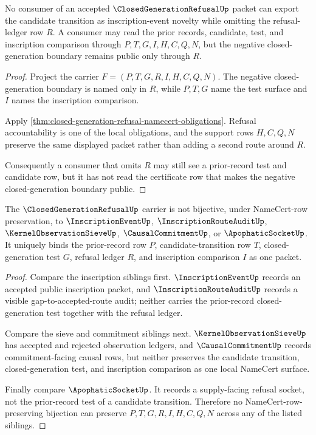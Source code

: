 \begin{theorem}
\label{thm:closed-generation-refusal-ledger-nonescape}
No consumer of an accepted $\ClosedGenerationRefusalUp$ packet can export the
candidate transition as inscription-event novelty while omitting the
refusal-ledger row $R$. A consumer may read the prior records, candidate,
test, and inscription comparison through $P,T,G,I,H,C,Q,N$, but the negative
closed-generation boundary remains public only through $R$.
\end{theorem}
\begin{proof}
Project the carrier $F=(P,T,G,R,I,H,C,Q,N)$. The negative
closed-generation boundary is named only in $R$, while $P,T,G$ name the test
surface and $I$ names the inscription comparison.

Apply \autoref{thm:closed-generation-refusal-namecert-obligations}. Refusal
accountability is one of the local obligations, and the support rows $H,C,Q,N$
preserve the same displayed packet rather than adding a second route around
$R$.

Consequently a consumer that omits $R$ may still see a prior-record test and
candidate row, but it has not read the certificate row that makes the negative
closed-generation boundary public.
\end{proof}

\begin{theorem}
\label{thm:closed-generation-refusal-sibling-independence}
The $\ClosedGenerationRefusalUp$ carrier is not bijective, under
NameCert-row preservation, to $\InscriptionEventUp$,
$\InscriptionRouteAuditUp$, $\KernelObservationSieveUp$,
$\CausalCommitmentUp$, or $\ApophaticSocketUp$. It uniquely binds the
prior-record row $P$, candidate-transition row $T$, closed-generation test
$G$, refusal ledger $R$, and inscription comparison $I$ as one packet.
\end{theorem}
\begin{proof}
Compare the inscription siblings first. $\InscriptionEventUp$ records an
accepted public inscription packet, and $\InscriptionRouteAuditUp$ records a
visible gap-to-accepted-route audit; neither carries the prior-record
closed-generation test together with the refusal ledger.

Compare the sieve and commitment siblings next. $\KernelObservationSieveUp$
has accepted and rejected observation ledgers, and $\CausalCommitmentUp$
records commitment-facing causal rows, but neither preserves the candidate
transition, closed-generation test, and inscription comparison as one local
NameCert surface.

Finally compare $\ApophaticSocketUp$. It records a supply-facing refusal
socket, not the prior-record test of a candidate transition. Therefore no
NameCert-row-preserving bijection can preserve $P,T,G,R,I,H,C,Q,N$ across
any of the listed siblings.
\end{proof}

